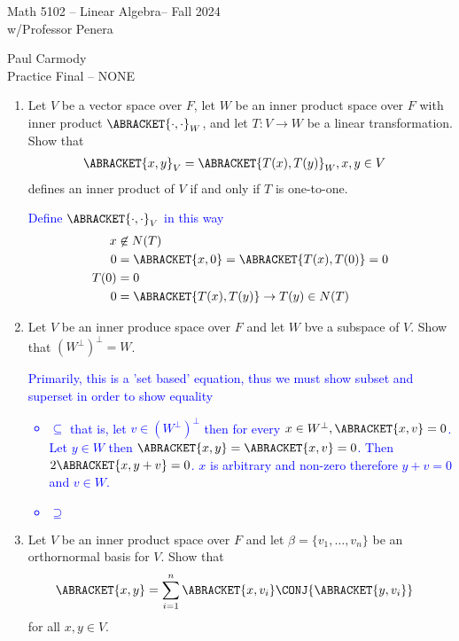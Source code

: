 \documentclass[10pt,a4paper]{report}
\newcommand{\CLASSNAME}{Math 5102 -- Linear Algebra}
\newcommand{\STUDENTNAME}{Paul Carmody}
\newcommand{\ASSIGNMENT}{Practice Final }
\newcommand{\DUEDATE}{NONE}
\newcommand{\SEMESTER}{Fall 2024}
\newcommand{\BLUE}[1]{\textcolor{blue}{#1}}
\begin{document}
\begin{center}
	\Large{\CLASSNAME -- \SEMESTER} \\
	\large{ w/Professor Penera}
\end{center}
\begin{center}
	\STUDENTNAME \\
	\ASSIGNMENT -- \DUEDATE\\
\end{center} 

\begin{enumerate}
	\item Let $V$ be a vector space over $F$, let $W$ be an inner product space over $F$ with inner product $\ABRACKET{\cdot, \cdot}_W$, and let $T:V\to W$ be a linear transformation.  Show that 
	\begin{align*}
		\ABRACKET{x,y}_V &= \ABRACKET{T(x), T(y)}_W, x,y \in V
	\end{align*}defines an inner product of $V$ if and only if $T$ is one-to-one.
	
	\BLUE{Define $\ABRACKET{\cdot,\cdot}_V$ in this way
	\begin{align*}
		 x &\not \in N(T)\\
		0 &= \ABRACKET{x, 0} = \ABRACKET{T(x), T(0)}=0\\
		T(0) &= 0\\
		0 &= \ABRACKET{T(x),T(y)} \to T(y) \in N(T)
	\end{align*}
	}
	
	\item Let $V$ be an inner produce space over $F$ and let $W$ bve a subspace of $V$.  Show that $(W^\perp)^\perp = W$.
	
	\BLUE{Primarily, this is a 'set based' equation, thus we must show subset and superset in order to show equality
	\begin{itemize}
		\item $\subseteq$ that is, let $v \in (W^\perp)^\perp$ then for every $x \in W^\perp, \ABRACKET{x,v}=0$.  Let $y \in W$ then $\ABRACKET{x,y} = \ABRACKET{x,v}=0$.  Then $2\ABRACKET{x,y+v}=0$.  $x$ is arbitrary and non-zero therefore $y+v=0$ and $v \in W$.
		\item $\supseteq$
\end{itemize}	
	}
	
	\item Let $V$ be an inner product space over $F$ and let $\beta = \{v_1, \dots, v_n\}$ be an orthornormal basis for $V$. Show that
	\begin{align*}
		\ABRACKET{x,y} &= \sum_{i=1}^n \ABRACKET{x,v_i}\CONJ{\ABRACKET{y, v_i}}
	\end{align*}for all $x,y \in V$.
	

\end{enumerate}
\end{document}
